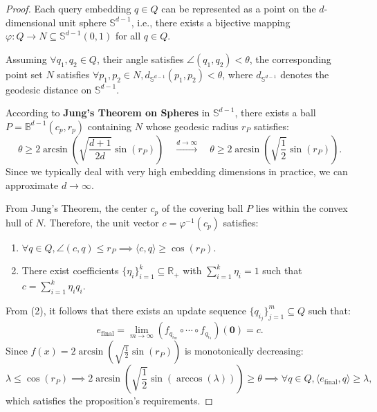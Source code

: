 \begin{proof}
\label{pr}
Each query embedding $q \in Q$ can be represented as a point on the $d$-dimensional unit sphere $\mathbb{S}^{d-1}$, i.e., there exists a bijective mapping $\varphi : Q \to N \subseteq \mathbb{S}^{d-1}(0,1)$ for all $q \in Q$.

Assuming $\forall q_1, q_2 \in Q$, their angle satisfies $\angle(q_1, q_2) < \theta$, the corresponding point set $N$ satisfies $\forall p_1, p_2 \in N, d_{\mathbb{S}^{d-1}}(p_1, p_2) < \theta$, where $d_{\mathbb{S}^{d-1}}$ denotes the geodesic distance on $\mathbb{S}^{d-1}$.

According to \textbf{Jung's Theorem on Spheres} \cite{jung-theory1,jung-theory2} in $\mathbb{S}^{d-1}$, there exists a ball $P = \mathbb{B}^{d-1}(c_p,r_p)$ containing $N$ whose geodesic radius $r_P$ satisfies:
\[
\theta \geq 2\arcsin\left(\sqrt{\frac{d+1}{2d}}\sin(r_P)\right) 
\quad \xrightarrow{d \to \infty} \quad 
\theta \geq 2\arcsin\left(\sqrt{\frac{1}{2}}\sin(r_P)\right).
\]
Since we typically deal with very high embedding dimensions in practice, we can approximate $d \to \infty$.

From Jung's Theorem, the center $c_p$ of the covering ball $P$ lies within the convex hull of $N$. Therefore, the unit vector $c = \varphi^{-1}(c_p)$ satisfies:
\begin{enumerate}[label=\arabic*)]
\item $\forall q \in Q, \angle(c, q) \leq r_P \implies \langle c, q \rangle \geq \cos(r_P).$
\item There exist coefficients $\{\eta_i\}_{i=1}^k \subseteq \mathbb{R}_+$ with $\sum_{i=1}^k \eta_i = 1$ such that $c = \sum_{i=1}^k \eta_i q_i.$
\end{enumerate}

From (2), it follows that there exists an update sequence $\{q_{i_j}\}_{j=1}^m \subseteq Q$ such that:
\[
e_{\text{final}} = \lim_{m \to \infty} (f_{q_{i_m}} \circ \cdots \circ f_{q_{i_1}})(\mathbf{0}) = c.
\]
Since $f(x) = 2\arcsin\left(\sqrt{\frac{1}{2}}\sin(r_P)\right)$ is monotonically decreasing:
\[
\lambda \leq \cos(r_P) \implies 2\arcsin\left(\sqrt{\frac{1}{2}}\sin(\arccos(\lambda))\right) \geq \theta \implies \forall q \in Q, \langle e_{\text{final}}, q \rangle \geq \lambda,
\]
which satisfies the proposition's requirements.
\end{proof}
